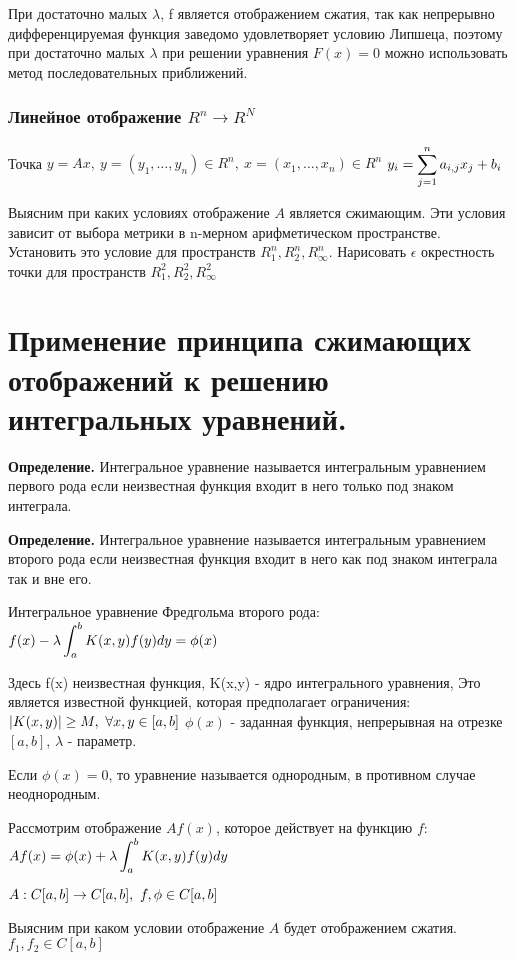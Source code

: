 \documentclass[12pt]{report}
\renewcommand{\[}{$\\\displaystyle}
\renewcommand{\]}{\\$}
\renewcommand{\[}{$\\\displaystyle}
\newcommand{\sep}{,\ }
\newcommand{\tdef}{\textbf{Определение.} }
\begin{document}
При достаточно малых $\lambda$, f является отображением сжатия, так как непрерывно дифференцируемая функция заведомо удовлетворяет условию Липшеца, поэтому при достаточно малых $\lambda$ при решении уравнения $F(x)=0$ можно использовать метод последовательных приближений.

\subsubsection{Линейное отображение $R^n \rightarrow R^N$}

Точка $y=Ax\sep y=(y_1,\dots,y_n) \in R^n\sep x=(x_1,\dots,x_n) \in R^n$
\[ y_i=\sum_{j=1}^n a_{i,j}x_j+b_i\]

Выясним при каких условиях отображение $A$ является сжимающим. Эти условия зависит от выбора метрики в n-мерном арифметическом пространстве. Установить это условие для пространств $R_1^n,R_2^n,R_\infty^n$. Нарисовать $\epsilon$ окрестность точки для пространств $R_1^2,R_2^2,R_\infty^2$

\section{Применение принципа сжимающих отображений к решению интегральных уравнений.}

\tdef Интегральное уравнение называется интегральным уравнением первого рода если неизвестная функция входит в него только под знаком интеграла.

\tdef Интегральное уравнение называется интегральным уравнением второго рода если неизвестная функция входит в него как под знаком интеграла так и вне его.

Интегральное уравнение Фредгольма второго рода:
\[ f(x)-\lambda\int_a^bK(x,y)f(y)dy=\phi(x)\]

Здесь f(x) неизвестная функция, K(x,y) - ядро интегрального уравнения, Это является известной функцией, которая предполагает ограничения:
\[ |K(x,y)|\geq M\sep\forall x,y\in[a,b]\]
$\phi(x)$ - заданная функция, непрерывная на отрезке $[a,b]$, $\lambda$ - параметр.

Если $\phi(x) = 0$, то уравнение называется однородным, в противном случае неоднородным.

Рассмотрим отображение $Af(x)$, которое действует на функцию $f$:
\[ Af(x)=\phi(x)+\lambda\int_a^bK(x,y)f(y)dy\]

\[ A: C[a, b]\rightarrow C[a,b]\sep f,\phi \in C[a,b]\]

Выясним при каком условии отображение $A$ будет отображением сжатия. $f_1, f_2 \in C[a,b]$
\end{document}

